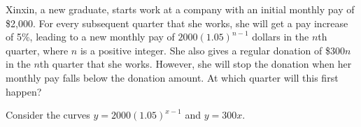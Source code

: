 \documentclass{jhwhw}
\begin{document}
            \begin{center}
            \end{center}

            

    \problem{}
        Xinxin, a new graduate, starts work at a company with an initial monthly pay of \$2,000. For every subsequent quarter that she works, she will get a pay increase of 5\%, leading to a new monthly pay of $2000(1.05)^{n-1}$ dollars in the $n$th quarter, where $n$ is a positive integer. She also gives a regular donation of \$$300n$ in the $n$th quarter that she works. However, she will stop the donation when her monthly pay falls below the donation amount. At which quarter will this first happen?

    \solution
        Consider the curves $y = 2000(1.05)^{x-1}$ and $y=300x$.
\end{document}
